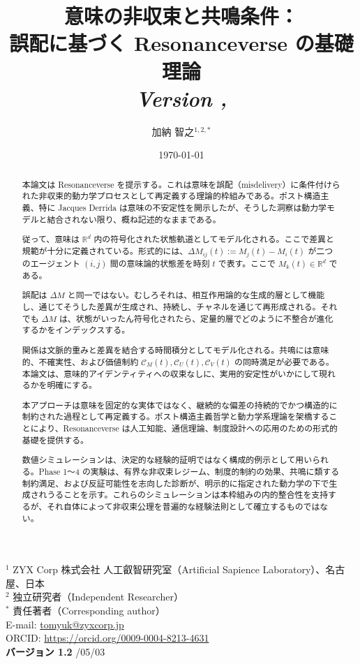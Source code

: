 \documentclass[11pt,a4paper]{article}
\title{意味の非収束と共鳴条件：\\
誤配に基づく Resonanceverse の基礎理論\\
\large \textit{Version \versionnum, \versiondate}}
\author{加納 智之$^{1,2,*}$}
\date{\today}
\theoremstyle{definition}
\newcommand{\versionnum}{1.2}
\newcommand{\versiondate}{2026/05/03}
\begin{document}
\maketitle

\begin{center}
\small
$^{1}$ ZYX Corp 株式会社 人工叡智研究室（Artificial Sapience Laboratory）、名古屋、日本\\
$^{2}$ 独立研究者（Independent Researcher）\\
$^{*}$ 責任著者（Corresponding author）\\
E-mail: \url{tomyuk@zyxcorp.jp}\\
ORCID: \url{https://orcid.org/0009-0004-8213-4631}\\
\vspace{0.3cm}
\textbf{バージョン \versionnum} \quad \versiondate
\end{center}

\vspace{0.5cm}

\begin{abstract}
本論文は Resonanceverse を提示する。これは意味を誤配（misdelivery）に条件付けられた非収束的動力学プロセスとして再定義する理論的枠組みである。ポスト構造主義、特に Jacques Derrida は意味の不安定性を開示したが、そうした洞察は動力学モデルと結合されない限り、概ね記述的なままである。

従って、意味は $\mathbb{R}^d$ 内の符号化された状態軌道としてモデル化される。ここで差異と規範が十分に定義されている。形式的には、$\Delta M_{ij}(t) := M_j(t) - M_i(t)$ が二つのエージェント $(i, j)$ 間の意味論的状態差を時刻 $t$ で表す。ここで $M_k(t) \in \mathbb{R}^d$ である。

誤配は $\Delta M$ と同一ではない。むしろそれは、相互作用論的な生成的層として機能し、通じてそうした差異が生成され、持続し、チャネルを通じて再形成される。それでも $\Delta M$ は、状態がいったん符号化されたら、定量的層でどのように不整合が進化するかをインデックスする。

関係は文脈的重みと差異を結合する時間積分としてモデル化される。共鳴には意味的、不確実性、および価値制約 $\mathcal{C}_M(t), \mathcal{C}_U(t), \mathcal{C}_V(t)$ の同時満足が必要である。本論文は、意味的アイデンティティへの収束なしに、実用的安定性がいかにして現れるかを明確にする。

本アプローチは意味を固定的な実体ではなく、継続的な偏差の持続的でかつ構造的に制約された過程として再定義する。ポスト構造主義哲学と動力学系理論を架橋することにより、Resonanceverse は人工知能、通信理論、制度設計への応用のための形式的基礎を提供する。

数値シミュレーションは、決定的な経験的証明ではなく構成的例示として用いられる。Phase 1～4 の実験は、有界な非収束レジーム、制度的制約の効果、共鳴に類する制約満足、および反証可能性を志向した診断が、明示的に指定された動力学の下で生成されうることを示す。これらのシミュレーションは本枠組みの内的整合性を支持するが、それ自体によって非収束公理を普遍的な経験法則として確立するものではない。
\end{abstract}
\end{document}
